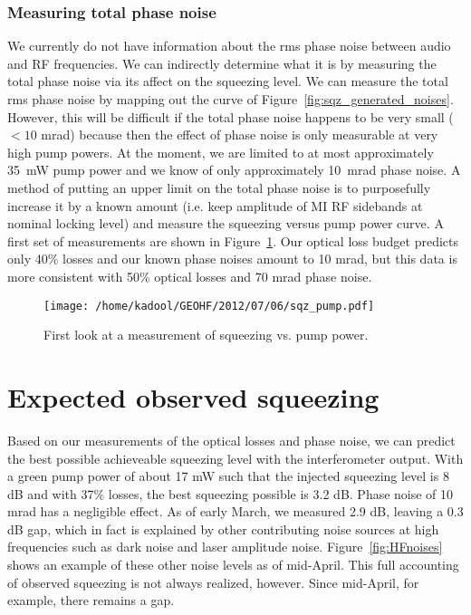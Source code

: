 \documentclass{ligodoc}
\begin{document}
\subsubsection{Measuring total phase noise}
We currently do not have information about the rms phase noise between
audio and RF frequencies. We can indirectly determine what it is by
measuring the total phase noise via its affect on the squeezing
level. We can measure the total rms phase noise by mapping out the
curve of Figure~\ref{fig:sqz_generated_noises}. However, this will be
difficult if the total phase noise happens to be very small ($< 10$
mrad) because then the effect of phase noise is only measurable at
very high pump powers. At the moment, we are limited to at most
approximately 35~mW pump power and we know of only approximately
10~mrad phase noise. A method of putting an upper limit on the total
phase noise is to purposefully increase it by a known amount
(i.e. keep amplitude of MI RF sidebands at nominal locking level) and
measure the squeezing versus pump power curve. A first set of
measurements are shown in Figure~\ref{fig:sqzpump}. Our optical loss
budget predicts only 40\% losses and our known phase noises amount to
10 mrad, but this data is more consistent with 50\% optical losses and
70 mrad phase noise.

\begin{figure}
\begin{centering}
\texttt{[image: /home/kadool/GEOHF/2012/07/06/sqz\_pump.pdf]}
\caption{First look at a measurement of squeezing vs. pump power.}
\label{fig:sqzpump}
\end{centering}
\end{figure}



\section{Expected observed squeezing}
Based on our measurements of the optical losses and phase noise, we
can predict the best possible achieveable squeezing level with the
interferometer output. With a green pump power of about 17 mW such
that the injected squeezing level is 8 dB and with 37\% losses, the
best squeezing possible is 3.2 dB. Phase noise of 10 mrad has a
negligible effect. As of early March, we measured 2.9 dB, leaving a
0.3 dB gap, which in fact is explained by other contributing noise
sources at high frequencies such as dark noise and laser amplitude
noise. Figure~\ref{fig:HFnoises} shows an example of these other
noise levels as of mid-April. This full accounting of observed
squeezing is not always realized, however. Since mid-April, for
example, there remains a gap.
\end{document}
